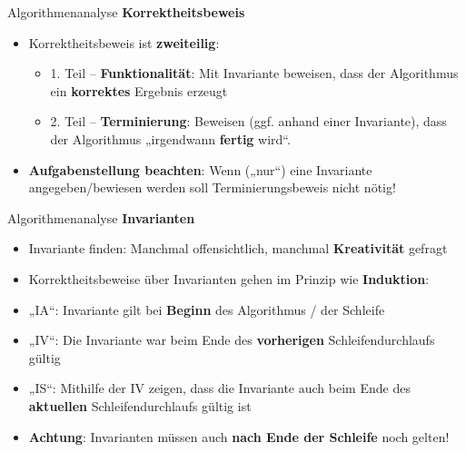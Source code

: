 \begin{frame}{Algorithmenanalyse}
	\textbf{Korrektheitsbeweis} \\
	
	\begin{itemize}
		\item Korrektheitsbeweis ist \textbf{zweiteilig}:
		
		\begin{itemize}
			\item 1. Teil -- \textbf{Funktionalität}: Mit Invariante beweisen, dass der Algorithmus ein \textbf{korrektes} Ergebnis erzeugt
			
			\item 2. Teil -- \textbf{Terminierung}: Beweisen (ggf. anhand einer Invariante), dass der Algorithmus „irgendwann \textbf{fertig} wird“.
		\end{itemize}
		
		\item \textbf{Aufgabenstellung beachten}: Wenn („nur“) eine Invariante angegeben/bewiesen werden soll \impl Terminierungsbeweis nicht nötig!
	\end{itemize}
\end{frame}

\begin{frame}{Algorithmenanalyse}
	\textbf{Invarianten} \\
	
	\begin{itemize}
		\item Invariante finden: Manchmal offensichtlich, manchmal \textbf{Kreativität} gefragt
		\pause
		\item Korrektheitsbeweise über Invarianten gehen im Prinzip wie \textbf{Induktion}:
		\pause
		\item „IA“: Invariante gilt bei \textbf{Beginn} des Algorithmus / der Schleife
		\pause
		\item „IV“: Die Invariante war beim Ende des \textbf{vorherigen} Schleifendurchlaufs gültig
		\pause
		\item „IS“: Mithilfe der IV zeigen, dass die Invariante auch beim Ende des \textbf{aktuellen} Schleifendurchlaufs gültig ist
		\item \textbf{Achtung}: Invarianten müssen auch \textbf{nach Ende der Schleife} noch gelten!
	\end{itemize}
\end{frame}

